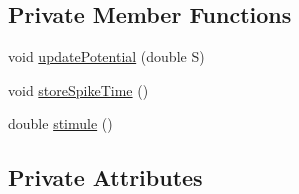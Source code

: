 \subsection*{Private Member Functions}
\begin{DoxyCompactItemize}
\item 
void \hyperlink{classNeuron_ac5936dd706416d5268ec11d24f5456e6}{update\-Potential} (double S)
\item 
void \hyperlink{classNeuron_a08d42d3ef5c91ad5f7c9cd7d54fff714}{store\-Spike\-Time} ()
\item 
double \hyperlink{classNeuron_a572f11ba08ac1fef947058ea1de86be6}{stimule} ()
\end{DoxyCompactItemize}
\subsection*{Private Attributes}
